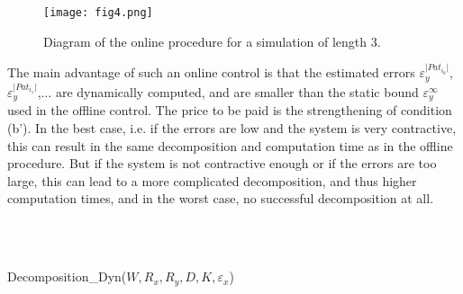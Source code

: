 \begin{figure}[ht]
\centering
 \texttt{[image: fig4.png]}
 \caption{Diagram of the online procedure for a simulation of length 3.}
 \label{fig:fig4}
\end{figure}

 The main advantage of such an online control is that the estimated errors $\varepsilon_y^{\vert Pat_{i_0} \vert}$,$\varepsilon_y^{\vert Pat_{i_1} \vert}$,$\dots$
are dynamically computed, and are smaller than the static bound $\varepsilon_y^\infty$ used
in the offline control. The price to be paid is the strengthening of
condition (b'). In the best case, i.e. if the errors are low and the system is very contractive,
this can result in the same decomposition and computation time as in the offline procedure.
But if the system is not contractive enough or if the errors are too large, this can 
lead to a more complicated decomposition, and thus higher computation times,
and in the worst case, no successful decomposition at all. 
 
 
 \begin{algorithm}[ht]
 \centering
 \begin{algorithmic}
  \\
  \ELSE
       \ELSE {}\ \ \ \\
	    \ENDFOR
 	\ENDIF    
\ENDIF
 \end{algorithmic}
\caption{{\small Decomposition\_Dyn($W,R_x,R_y,D,K,\varepsilon_x$)}}  
\label{alg:decompo2_part5}  
\end{algorithm}

